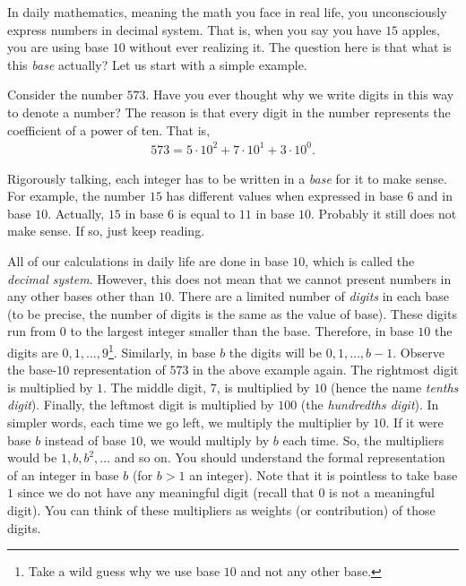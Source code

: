 \documentclass{subfile}
\begin{document}
	In daily mathematics, meaning the math you face in real life, you unconsciously express numbers in decimal system. That is, when you say you have $15$ apples, you are using base $10$ without ever realizing it. The question here is that what is this \textit{base} actually? Let us start with a simple example.
	\begin{example}
		Consider the number $573$. Have you ever thought why we write digits in this way to denote a number? The reason is that every digit in the number represents the coefficient of a power of ten. That is,
		\begin{align*}
			573 = 5 \cdot 10^2 + 7 \cdot 10^1 + 3 \cdot 10^0.
		\end{align*}
	\end{example}
	Rigorously talking, each integer has to be written in a \textit{base} for it to make sense. For example, the number $15$ has different values when expressed in base $6$ and in base $10$. Actually, $15$ in base $6$ is equal to $11$ in base $10$. Probably it still does not make sense. If so, just keep reading.

	All of our calculations in daily life are done in base $10$, which is called the \textit{decimal system}. However, this does not mean that we cannot present numbers in any other bases other than $10$. There are a limited number of \textit{digits} in each base (to be precise, the number of digits is the same as the value of base). These digits run from $0$ to the largest integer smaller than the base. Therefore, in base $10$ the digits are $0,1,\dots,9$\footnote{Take a wild guess why we use base $10$ and not any other base.}. Similarly, in base $b$ the digits will be $0,1,\dots,b-1$. Observe the base-$10$ representation of $573$ in the above example again. The rightmost digit is multiplied by $1$. The middle digit, $7$, is multiplied by $10$ (hence the name \textit{tenths digit}). Finally, the leftmost digit is multiplied by $100$ (the \textit{hundredths digit}). In simpler words, each time we go left, we multiply the multiplier by $10$. If it were base $b$ instead of base $10$, we would multiply by $b$ each time. So, the multipliers would be $1,b,b^2,\dots$ and so on. You should understand the formal representation of an integer in base $b$ (for $b>1$ an integer). Note that it is pointless to take base $1$ since we do not have any meaningful digit (recall that $0$ is not a meaningful digit). You can think of these multipliers as weights (or contribution) of those digits.
\end{document}
